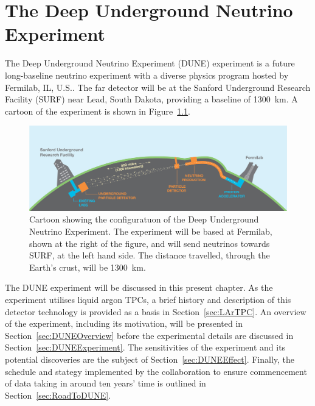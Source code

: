 
\graphicspath{{DUNE/Figs/}}

\chapter{The Deep Underground Neutrino Experiment}\label{chap:DUNE}

The Deep Underground Neutrino Experiment (DUNE) experiment \cite{DUNECDR1,DUNECDR2,DUNECDR3,DUNECDR4} is a future long-baseline neutrino experiment with a diverse physics program hosted by Fermilab, IL, U.S..  The far detector will be at the Sanford Underground Research Facility (SURF) near Lead, South Dakota, providing a baseline of 1300~km.  A cartoon of the experiment is shown in Figure~\ref{fig:DUNE}.

\begin{figure}
  \centering
  \includegraphics[width=14cm]{DUNE.jpg}
  \caption[Cartoon showing the configuration of the Deep Underground Neutrino Experiment.]{Cartoon showing the configuratuon of the Deep Underground Neutrino Experiment.  The experiment will be based at Fermilab, shown at the right of the figure, and will send neutrinos towards SURF, at the left hand side.  The distance travelled, through the Earth's crust, will be 1300~km.}
  \label{fig:DUNE}
\end{figure}

The DUNE experiment will be discussed in this present chapter.  As the experiment utilises liquid argon TPCs, a brief history and description of this detector technology is provided as a basis in Section~\ref{sec:LArTPC}.  An overview of the experiment, including its motivation, will be presented in Section~\ref{sec:DUNEOverview} before the experimental details are discussed in Section~\ref{sec:DUNEExperiment}.  The sensitivities of the experiment and its potential discoveries are the subject of Section~\ref{sec:DUNEEffect}.  Finally, the schedule and stategy implemented by the collaboration to ensure commencement of data taking in around ten years' time is outlined in Section~\ref{sec:RoadToDUNE}.


